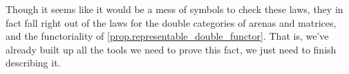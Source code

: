 \documentclass[DynamicalBook]{subfiles}
\begin{document}
Though it seems like it would be a mess of symbols to check these laws, they in
fact fall right out of the laws for the double categories of arenas and
matrices, and the functoriality of \cref{prop.representable_double_functor}.
That is, we've already built up all the tools we need to prove this fact, we
just need to finish describing it.


\end{document}
